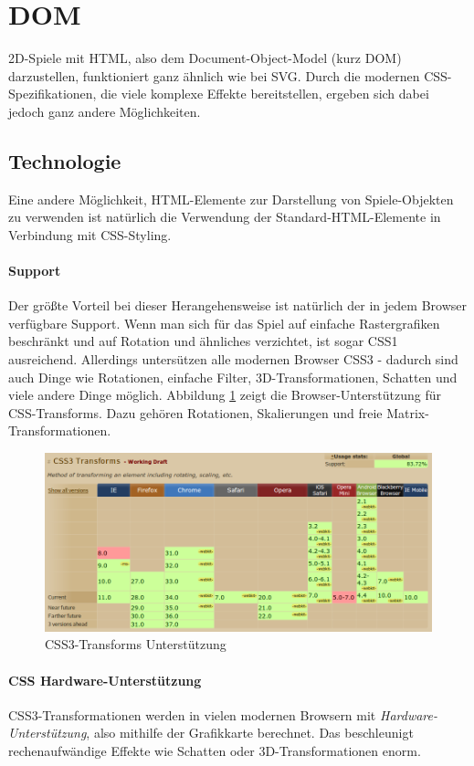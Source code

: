 \documentclass[a4paper, 12pt]{article}
\begin{document}
\section{DOM}
2D-Spiele mit HTML, also dem Document-Object-Model (kurz DOM) darzustellen, funktioniert ganz ähnlich wie bei SVG. Durch die modernen CSS-Spezifikationen, die viele komplexe Effekte bereitstellen, ergeben sich dabei jedoch ganz andere Möglichkeiten.
\subsection{Technologie}
Eine andere Möglichkeit, HTML-Elemente zur Darstellung von Spiele-Objekten zu verwenden ist natürlich die Verwendung der Standard-HTML-Elemente in Verbindung mit CSS-Styling.
\paragraph{Support} Der größte Vorteil bei dieser Herangehensweise ist natürlich der in jedem Browser verfügbare Support. Wenn man sich für das Spiel auf einfache Rastergrafiken beschränkt und auf Rotation und ähnliches verzichtet, ist sogar CSS1 ausreichend. Allerdings untersützen alle modernen Browser CSS3 - dadurch sind auch Dinge wie Rotationen, einfache Filter, 3D-Transformationen, Schatten und viele andere Dinge möglich. Abbildung \ref{css_transforms_support} zeigt die Browser-Unterstützung für CSS-Transforms. Dazu gehören Rotationen, Skalierungen und freie Matrix-Transformationen. 
\begin{figure}[H]
	\begin{center}
		\includegraphics[width=\textwidth]{assets/css_transforms_support.png} 
	\end{center}
	\caption{CSS3-Transforms Unterstützung}
	\label{css_transforms_support}
\end{figure}
\paragraph{CSS Hardware-Unterstützung} CSS3-Transformationen werden in vielen modernen Browsern mit \emph{Hardware-Unterstützung}, also mithilfe der Grafikkarte berechnet. Das beschleunigt rechenaufwändige Effekte wie Schatten oder 3D-Transformationen enorm.
\end{document}
